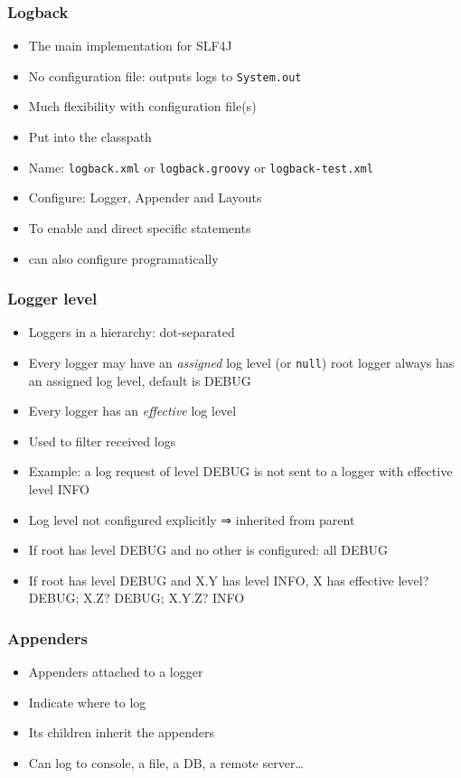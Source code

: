 \documentclass[french, english]{beamer}
\begin{document}
\begin{frame}
	\frametitle{Logback}
	\begin{itemize}
		\item The main implementation for SLF4J
		\item No configuration file: outputs logs to \texttt{System.out}
		\item Much flexibility with configuration file(s)
		\item Put into the classpath
		\item Name: \texttt{logback.xml} {\tiny or \texttt{logback.groovy} or \texttt{logback-test.xml}}
		\item Configure: Logger, Appender and Layouts
		\item To enable and direct specific statements
		\item {\tiny can also configure programatically}
	\end{itemize}
\end{frame}

\begin{frame}
	\frametitle{Logger level}
	\begin{itemize}
		\item Loggers in a hierarchy: dot-separated
		\item Every logger may have an \emph{assigned} log level (or \texttt{null}) {\tiny root logger always has an assigned log level, default is DEBUG}
		\item Every logger has an \emph{effective} log level
		\item Used to filter received logs
		\item Example: a log request of level DEBUG is not sent to a logger with effective level INFO
		\item Log level not configured explicitly ⇒ inherited from parent
		\item If root has level DEBUG and no other is configured: all DEBUG
		\item If root has level DEBUG and X.Y has level INFO, X has effective level? \pause DEBUG; X.Z? \pause DEBUG; X.Y.Z? \pause INFO
	\end{itemize}
\end{frame}

\begin{frame}
	\frametitle{Appenders}
	\begin{itemize}
		\item Appenders attached to a logger
		\item Indicate where to log
		\item Its children inherit the appenders
		\item Can log to console, a file, a DB, a remote server…
	\end{itemize}
\end{frame}
\end{document}
